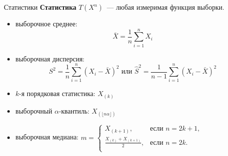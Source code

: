 \documentclass[11pt,pdf,utf8,hyperref={unicode},aspectratio=169]{beamer}
\begin{document}
\begin{frame}{Статистики}
	\textbf{Статистика} $T(X^n)$~--- любая измеримая функция выборки.

	\begin{itemize}
		\item выборочное среднее:
		$$\bar{X} = \frac{1}{n}\sum\limits_{i=1}^n X_i$$
		\item выборочная дисперсия:
		$$
            S^2 = \frac{1}{n}\sum\limits_{i=1}^n \left(X_i-\bar{X}\right)^2
            \text{ или }
            \hat{S}^2 = \frac{1}{n-1}\sum\limits_{i=1}^n \left(X_i-\bar{X}\right)^2
        $$
	    \item $k$-я порядковая статистика: $X_{(k)}$
		\item выборочный $\alpha$-квантиль: $X_{(\lfloor n\alpha\rfloor)}$
		\item выборочная медиана:
		$
        m = \begin{cases}
		  X_{(k+1)}, & \text{если } n=2k+1, \\
		  \frac{X_{(k)}+X_{(k+1)}}{2}, & \text{если } n=2k.\\
		\end{cases}
        $
	\end{itemize}

\end{frame}
\end{document}
